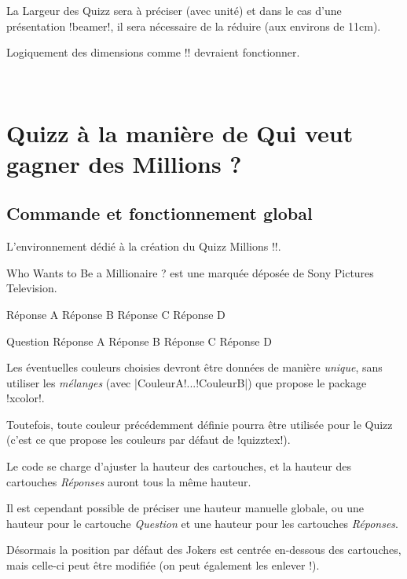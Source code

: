 \documentclass[french,a4paper,11pt]{article}
\newcommand\cmaj[1]{\tcbox[vignetteMaJ]{#1}\xspace}
\begin{document}
\begin{tipblock}
La Largeur des Quizz sera à préciser (avec unité) et dans le cas d'une présentation \packagetex!beamer!, il sera nécessaire de la réduire (aux environs de 11cm).

Logiquement des dimensions comme \motcletex!\linewidth! devraient fonctionner.
\end{tipblock}

\vfill~

\pagebreak

\section{Quizz à la manière de \og Qui veut gagner des Millions ? \fg}

\subsection{Commande et fonctionnement global}

\begin{cautionblock}
L'environnement dédié à la création du Quizz \og Millions \fg{} \motcletex!\QuizzMillions!.

\smallskip

\textsf{Who Wants to Be a Millionaire ?\texttrademark} est une marquée déposée de Sony Pictures Television.
\end{cautionblock}

\begin{DemoCode}
	{Réponse A}
	{Réponse B}
	{Réponse C}
	{Réponse D}
\end{DemoCode}

\begin{DemoCode}
\QuizzMillions
	{Question}
	{Réponse A}
	{Réponse B}
	{Réponse C}
	{Réponse D}
\end{DemoCode}

\begin{tipblock}
Les éventuelles couleurs choisies devront être données de manière \textit{unique}, sans utiliser les \textit{mélanges} (avec \motcletex|CouleurA!...!CouleurB|) que propose le package \packagetex!xcolor!.

Toutefois, toute couleur précédemment définie pourra être utilisée pour le Quizz (c'est ce que propose les couleurs par défaut de \packagetex!quizztex!).
\end{tipblock}

\begin{importantblock}
Le code se charge d'ajuster la hauteur des cartouches, et la hauteur des cartouches \textit{Réponses} auront tous la même hauteur.

\smallskip

Il est cependant possible de préciser une hauteur manuelle globale, ou une hauteur pour le cartouche \textit{Question} et une hauteur pour les cartouches \textit{Réponses}.

\smallskip

\cmaj{0.1.1} Désormais la position par défaut des \textsf{Jokers} est centrée en-dessous des cartouches, mais celle-ci peut être modifiée (on peut également les enlever !).
\end{importantblock}
\end{document}
